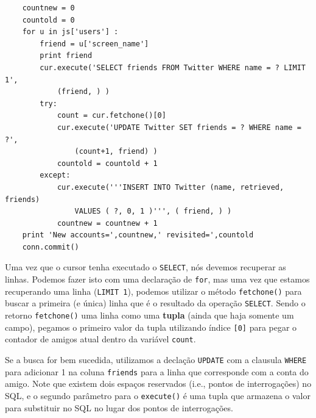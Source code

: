 \beforeverb
\begin{verbatim}
    countnew = 0
    countold = 0
    for u in js['users'] :
        friend = u['screen_name']
        print friend
        cur.execute('SELECT friends FROM Twitter WHERE name = ? LIMIT 1', 
            (friend, ) )
        try:
            count = cur.fetchone()[0]
            cur.execute('UPDATE Twitter SET friends = ? WHERE name = ?', 
                (count+1, friend) )
            countold = countold + 1
        except:
            cur.execute('''INSERT INTO Twitter (name, retrieved, friends) 
                VALUES ( ?, 0, 1 )''', ( friend, ) )
            countnew = countnew + 1
    print 'New accounts=',countnew,' revisited=',countold
    conn.commit()
\end{verbatim}
\afterverb
%

%
Uma vez que o cursor tenha executado o {\tt SELECT}, nós devemos recuperar as
linhas. Podemos fazer isto com uma declaração de {\tt for}, mas uma vez que
estamos recuperando uma linha ({\tt LIMIT 1}), podemos utilizar o método
{\tt fetchone()} para buscar a primeira (e única) linha que é o resultado da
operação {\tt SELECT}. Sendo o retorno {\tt fetchone()} uma linha como uma
{\bf tupla} (ainda que haja somente um campo), pegamos o primeiro valor da
tupla utilizando índice {\tt [0]} para pegar o contador de amigos atual dentro
da variável {\tt count}.


Se a busca for bem sucedida, utilizamos a declação {\tt UPDATE} com a clausula 
{\tt WHERE} para adicionar 1 na coluna {\tt friends} para a linha que
corresponde com a conta do amigo. Note que existem dois espaços reservados
(i.e., pontos de interrogações) no SQL, e o segundo parâmetro para o
{\tt execute()} é uma tupla que armazena o valor para substituir no SQL no
lugar dos pontos de interrogações.

